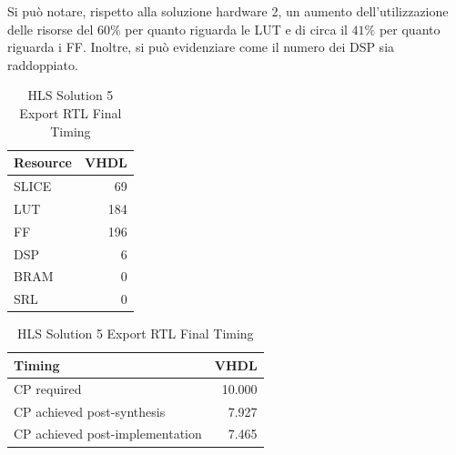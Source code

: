 Si può notare, rispetto alla soluzione hardware 2, un aumento dell'utilizzazione delle risorse del $60\%$ per quanto riguarda le LUT e di circa il $41\%$ per quanto riguarda i FF. Inoltre, si può evidenziare come il numero dei DSP sia raddoppiato.

\begin{table}[H]
	\centering
	\begin{minipage}[t]{0.45\linewidth}
		\centering
		\begin{tabular}{|l|r|}
			\hline
			\textbf{Resource} & \textbf{VHDL} \\
			\hline
			SLICE & 69 \\
			\hline
			LUT & 184 \\
			\hline
			FF & 196 \\
			\hline
			DSP & 6 \\
			\hline
			BRAM & 0 \\
			\hline
			SRL & 0 \\
			\hline
		\end{tabular}
		\caption{HLS Solution 5 Export RTL Resource Usage}
		\label{tab:hls-solution-4-export-rtl-resoruce-usage}
	\end{minipage}
	\hfill
	\begin{minipage}[t]{0.45\linewidth}
		\centering
		\begin{tabular}{|l|r|}
			\hline
			\textbf{Timing} & \textbf{VHDL} \\
			\hline
			CP required & 10.000 \\
			\hline
			CP achieved post-synthesis & 7.927 \\
			\hline
			CP achieved post-implementation & 7.465 \\
			\hline
		\end{tabular}
		\caption{HLS Solution 5 Export RTL Final Timing}
		\label{tab:hls-solution-4-export-rtl-final-timing}
	\end{minipage}
\end{table}